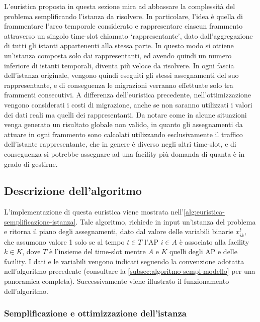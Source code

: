 L'euristica proposta in questa sezione mira ad abbassare la complessità del problema semplificando l'istanza da risolvere. In particolare, l'idea è quella di frammentare l'arco temporale considerato e rappresentare ciascun frammento attraverso un singolo time-slot chiamato `rappresentante', dato dall'aggregazione di tutti gli istanti appartenenti alla stessa parte. In questo modo si ottiene un'istanza composta solo dai rappresentanti, ed avendo quindi un numero inferiore di istanti temporali, diventa più veloce da risolvere. In ogni fascia dell'istanza originale, vengono quindi eseguiti gli stessi assegnamenti del suo rappresentante, e di conseguenza le migrazioni verranno effettuate solo tra frammenti consecutivi. A differenza dell'euristica precedente, nell'ottimizzazione vengono considerati i costi di migrazione, anche se non saranno utilizzati i valori dei dati reali ma quelli dei rappresentanti. Da notare come in alcune situazioni venga generato un risultato globale non valido, in quanto gli assegnamenti da attuare in ogni frammento sono calcolati utilizzando esclusivamente il traffico dell'istante rappresentante, che in genere è diverso negli altri time-slot, e di conseguenza si potrebbe assegnare ad una facility più domanda di quanta è in grado di gestirne.


\subsection{Descrizione dell'algoritmo}
\label{subsec:algoritmo-aggregazione}



L'implementazione di questa euristica viene mostrata nell'\autoref{alg:euristica-semplificazione-istanza}. Tale algoritmo, richiede in input un'istanza del problema e ritorna il piano degli assegnamenti, dato dal valore delle variabili binarie $x^t_{ik}$, che assumono valore 1 solo se al tempo $t \in T$ l'AP $i \in A$ è associato alla facility $k \in K$, dove $T$ è l'insieme del time-slot mentre $A$ e $K$ quelli degli AP e delle facility. I dati e le variabili vengono indicati seguendo la convenzione adotatta nell'algoritmo precedente (consultare la \autoref{subsec:algoritmo-sempl-modello} per una panoramica completa). Successivamente viene illustrato il funzionamento dell'algoritmo.

\subsubsection{Semplificazione e ottimizzazione dell'istanza}


